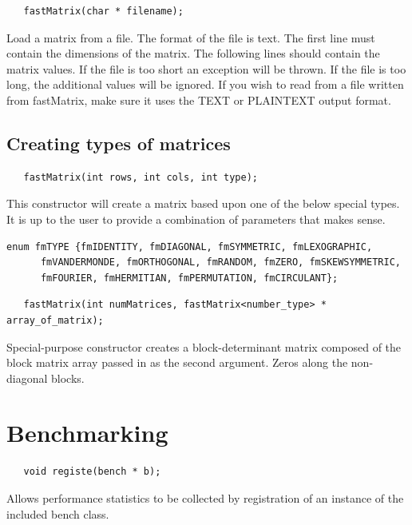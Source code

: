\documentclass[10pt,fullpage]{article}
\begin{document}
\begin{verbatim}
   fastMatrix(char * filename);
\end{verbatim}

Load a matrix from a file. The format of the file is text. The first
line must contain the dimensions of the matrix. The following lines
should contain the matrix values. If the file is too short an
exception will be thrown. If the file is too long, the additional
values will be ignored. If you wish to read from a file written from
fastMatrix, make sure it uses the TEXT or PLAINTEXT output format.

\subsection{Creating types of matrices}

\begin{verbatim}
   fastMatrix(int rows, int cols, int type);
\end{verbatim}

This constructor will create a matrix based upon one of the below
special types. It is up to the user to provide a combination of
parameters that makes sense.

\begin{verbatim}
enum fmTYPE {fmIDENTITY, fmDIAGONAL, fmSYMMETRIC, fmLEXOGRAPHIC,
      fmVANDERMONDE, fmORTHOGONAL, fmRANDOM, fmZERO, fmSKEWSYMMETRIC,
      fmFOURIER, fmHERMITIAN, fmPERMUTATION, fmCIRCULANT};
\end{verbatim}

\begin{verbatim}
   fastMatrix(int numMatrices, fastMatrix<number_type> * array_of_matrix);
\end{verbatim}

Special-purpose constructor creates a block-determinant matrix
composed of the block matrix array passed in as the second argument.
Zeros along the non-diagonal blocks.

\newpage

\section{Benchmarking}

\begin{verbatim}
   void registe(bench * b);
\end{verbatim}

Allows performance statistics to be collected by registration of an
instance of the included bench class.
\end{document}
